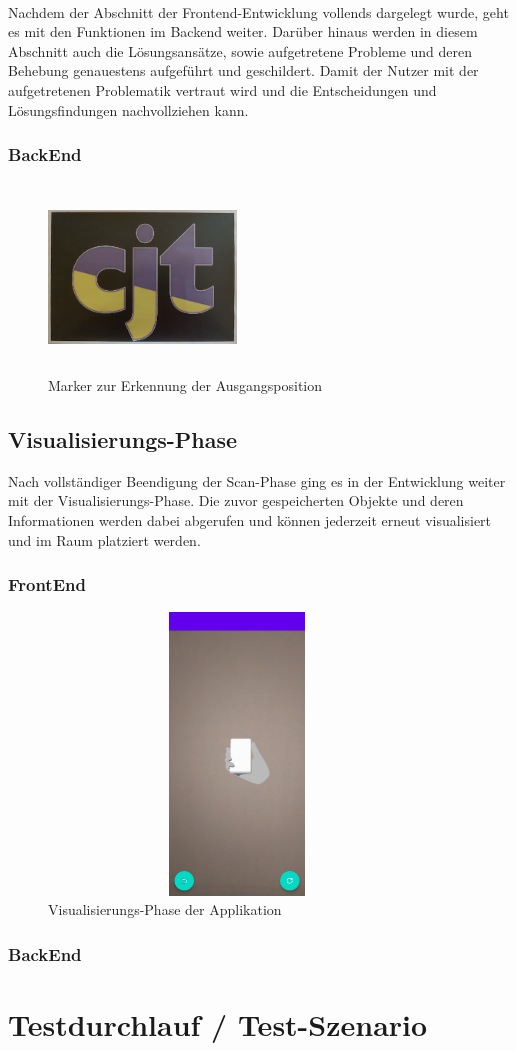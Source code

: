 \pagebreak
\\ 
Nachdem der Abschnitt der Frontend-Entwicklung vollends dargelegt wurde, geht es mit den Funktionen im Backend weiter. Darüber hinaus werden in diesem Abschnitt 
auch die Lösungsansätze, sowie aufgetretene Probleme und deren Behebung genauestens aufgeführt und geschildert. Damit der Nutzer mit der aufgetretenen 
Problematik vertraut wird und die Entscheidungen und Lösungsfindungen nachvollziehen kann. 
\subsubsection{BackEnd}
\begin{figure}[hbt!]
    \centering
    \includegraphics[width=5cm,height=5cm,keepaspectratio]{4Umsetzung/Bilder/cjt_logo_tracking.png}
    \caption{Marker zur Erkennung der Ausgangsposition}
    \label{pic:initialMarker}
\end{figure}

\subsection{Visualisierungs-Phase} 
Nach vollständiger Beendigung der Scan-Phase ging es in der Entwicklung weiter mit der Visualisierungs-Phase. Die zuvor gespeicherten Objekte und 
deren Informationen werden dabei abgerufen und können jederzeit erneut visualisiert und im Raum platziert werden.   
\subsubsection{FrontEnd}
\begin{figure}[hbt!]
    \centering
    \includegraphics[width=10cm,height=7.5cm,keepaspectratio]{4Umsetzung/Bilder/visual-phase.jpg}
    \caption{Visualisierungs-Phase der Applikation}
    \label{pic:visual}
\end{figure}
\subsubsection{BackEnd}

\section{Testdurchlauf / Test-Szenario}
\label{chap:testdurchlauf}